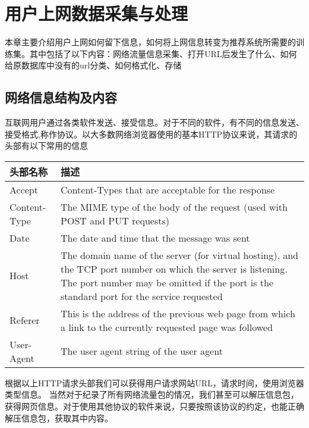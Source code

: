 \chapter{用户上网数据采集与处理}
本章主要介绍用户上网如何留下信息，如何将上网信息转变为推荐系统所需要的训练集。其中包括了以下内容：网络流量信息采集、打开URL后发生了什么、如何给原数据库中没有的url分类、如何格式化、存储
\section{网络信息结构及内容}
互联网用户通过各类软件发送、接受信息。对于不同的软件，有不同的信息发送、接受格式,称作协议。以大多数网络浏览器使用的基本HTTP协议来说，其请求的头部有以下常用的信息 \\
\begin{center}
\begin{tabular}{l|p{10cm}}
 \hline
头部名称 & 描述 \\ \hline
Accept & Content-Types that are acceptable for the response \\ \hline
Content-Type & The MIME type of the body of the request (used with POST and PUT requests) \\ \hline
Date & The date and time that the message was sent \\ \hline
Host & The domain name of the server (for virtual hosting), and the TCP port number on which the server is listening. The port number may be omitted if the port is the standard port for the service requested \\ \hline
Referer & This is the address of the previous web page from which a link to the currently requested page was followed \\ \hline
User-Agent & The user agent string of the user agent \\
\hline
\end{tabular}
\end{center}
根据以上HTTP请求头部我们可以获得用户请求网站URL，请求时间，使用浏览器类型信息。
当然对于纪录了所有网络流量包的情况，我们甚至可以解压信息包，获得网页信息。对于使用其他协议的软件来说，只要按照该协议的约定，也能正确解压信息包，获取其中内容。

